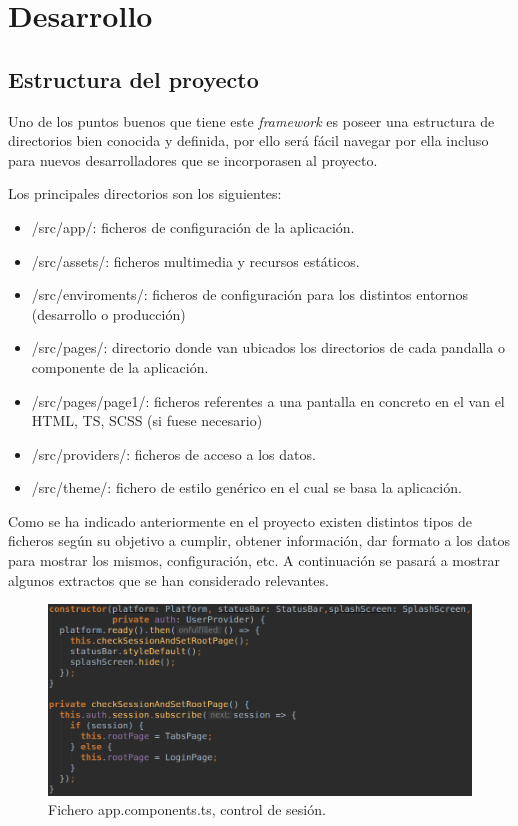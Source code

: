 \section{Desarrollo}
\subsection{Estructura del proyecto}

Uno de los puntos buenos que tiene este \textit{framework} es
poseer una estructura de directorios bien conocida y definida,
por ello será fácil navegar por ella incluso para nuevos
desarrolladores que se incorporasen al proyecto.

\medskip
Los principales directorios son los siguientes:

\begin{itemize}
    \item /src/app/: ficheros de configuración de la aplicación.
    \item /src/assets/: ficheros multimedia y recursos estáticos.
    \item /src/enviroments/: ficheros de configuración para los
    distintos entornos (desarrollo o producción)
    \item /src/pages/: directorio donde van ubicados los directorios
    de cada pandalla o componente de la aplicación.
    \item /src/pages/page1/: ficheros referentes a una pantalla en
    concreto en el van el HTML, TS, SCSS (si fuese necesario)
    \item /src/providers/: ficheros de acceso a los datos.
    \item /src/theme/: fichero de estilo genérico en el cual
    se basa la aplicación.
\end{itemize}

\medskip
Como se ha indicado anteriormente en el proyecto existen distintos
tipos de ficheros según su objetivo a cumplir, obtener información,
dar formato a los datos para mostrar los mismos, configuración, etc.
A continuación se pasará a mostrar algunos extractos que se han
considerado relevantes.

\begin{figure}
    \includegraphics[width=\linewidth]{./images/code/app-components-ts.png}
    \caption{Fichero app.components.ts, control de sesión.}
    \label{app.components.ts}
\end{figure}

